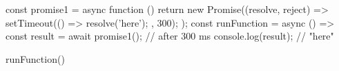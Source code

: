 const promise1 = async function (){
    return new Promise((resolve, reject) => {
        setTimeout(() => {
            resolve('here');
        }, 300);
    });
}
const runFunction = async () => {
    const result = await promise1(); // after 300 ms
    console.log(result); // "here"
}

runFunction()
